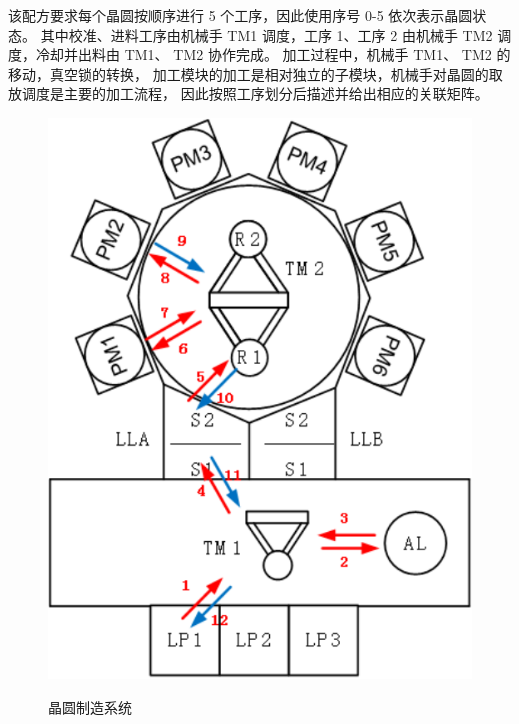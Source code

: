 该配方要求每个晶圆按顺序进行 5 个工序，因此使用序号 0-5 依次表示晶圆状态。
其中校准、进料工序由机械手 TM1 调度，工序 1、工序 2 由机械手 TM2 调度，冷却并出料由 TM1、 TM2 协作完成。
加工过程中，机械手 TM1、 TM2 的移动，真空锁的转换，
加工模块的加工是相对独立的子模块，机械手对晶圆的取放调度是主要的加工流程，
因此按照工序划分后描述并给出相应的关联矩阵。

\begin{figure}[H]
	\centering
	\includegraphics[scale=0.8,angle=0]{figures/4-1.png}\\
	\caption{晶圆制造系统}
\end{figure}

